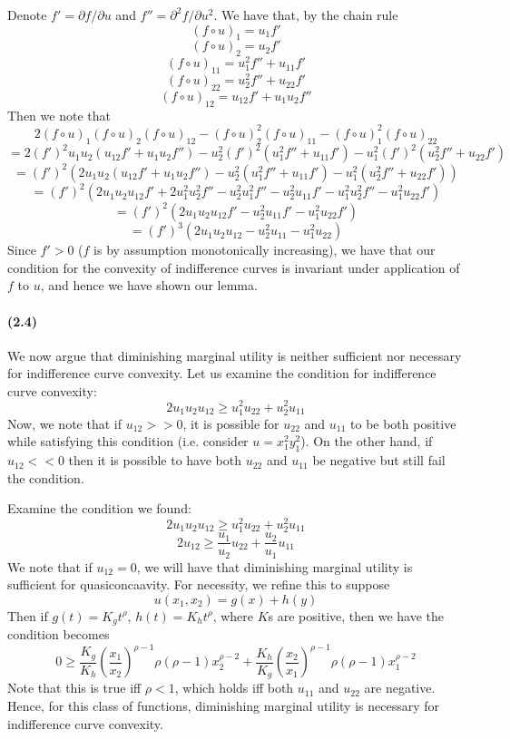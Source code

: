 \documentclass[10pt,letter]{article}
\begin{document}
Denote $f' = \partial f/\partial u$ and $f'' = \partial^2 f/\partial u^2$. We have that, by the chain rule
\[ (f \circ u)_1 = u_1 f' \]
\[ (f \circ u)_2 = u_2 f' \]
\[ (f \circ u)_{11} = u_1^2 f'' + u_{11} f'\]
\[ (f \circ u)_{22} = u_2^2 f'' + u_{22} f'\]
\[ (f \circ u)_{12} = u_{12} f' + u_1 u_2 f''\]
Then we note that
\[ 2(f \circ u)_1(f \circ u)_2(f \circ u)_{12} - (f \circ u)_2^2(f \circ u)_{11} - (f \circ u)_1^2(f \circ u)_{22} \]
\[ = 2(f')^2u_1u_2(u_{12} f' + u_1 u_2 f'') - u_2^2 (f')^2(u_1^2 f'' + u_{11} f') - u_1^2(f')^2(u_2^2 f'' + u_{22} f') \]
\[ = (f')^2 \left( 2u_1u_2(u_{12} f' + u_1 u_2 f'') - u_2^2(u_1^2 f'' + u_{11} f') - u_1^2(u_2^2 f'' + u_{22} f') \right) \]
\[ = (f')^2 \left( 2u_1u_2u_{12} f' + 2u_1^2 u_2^2 f'' - u_2^2u_1^2 f'' - u_2^2 u_{11} f' - u_1^2u_2^2 f'' - u_1^2 u_{22} f' \right) \]
\[ = (f')^2 \left( 2u_1u_2u_{12} f'  - u_2^2 u_{11} f' - u_1^2 u_{22} f' \right) \]
\[ = (f')^3 \left( 2u_1u_2u_{12}  - u_2^2 u_{11} - u_1^2 u_{22} \right) \]
Since $f' > 0$ ($f$ is by assumption monotonically increasing), we have that our condition for the convexity of indifference curves is invariant under application of $f$ to $u$, and hence we have shown our lemma.
\paragraph{(2.4)}
We now argue that diminishing marginal utility is neither sufficient nor necessary for indifference curve convexity. Let us examine the condition for indifference curve convexity:
\[ 2u_1 u_2 u_{12} \ge u_1^2 u_{22} + u_2^2 u_{11} \]
Now, we note that if $u_{12} >> 0$, it is possible for $u_{22}$ and $u_{11}$ to be both positive while satisfying this condition (i.e. consider $u = x_1^2y_1^2$). On the other hand, if $u_{12} << 0$ then it is possible to have both $u_{22}$ and $u_{11}$ be negative but still fail the condition.

Examine the condition we found:
\[ 2u_1u_2u_{12} \ge u_1^2 u_{22} + u_2^2 u_{11}\]
\[ 2u_{12} \ge \frac{u_1}{u_2} u_{22} + \frac{u_2}{u_1}u_{11} \]
We note that if $u_{12} = 0$, we will have that diminishing marginal utility is sufficient for quasiconcaavity. For necessity, we refine this to suppose
\[ u(x_1, x_2) = g(x) + h(y)\]
Then if $g(t) = K_g t^\rho$, $h(t) = K_h t^\rho$, where $K$s are positive, then we have the condition becomes
\[ 0 \ge \frac{K_g}{K_h}\left(\frac{x_1}{x_2}\right)^{\rho - 1}\rho(\rho-1)x_2^{\rho-2} + \frac{K_h}{K_g}\left(\frac{x_2}{x_1}\right)^{\rho - 1}\rho(\rho-1)x_1^{\rho-2} \]
Note that this is true iff $\rho < 1$, which holds iff both $u_{11}$ and $u_{22}$ are negative. Hence, for this class of functions, diminishing marginal utility is necessary for indifference curve convexity.
\end{document}
